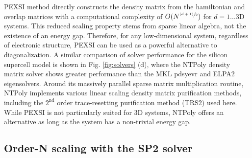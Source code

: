 \documentclass{revtex4-1}
\begin{document}
PEXSI\cite{pexsi_lin_2013} method directly constructs the density matrix from
the hamiltonian and overlap matrices with a computational complexity of
$O(N^{\sfrac{(d+1)}{2}})$ for $d=1\ldots3$D systems. This reduced scaling
property stems from sparse linear algebra, not the existence of an energy
gap. Therefore, for any low-dimensional system, regardless of electronic
structure, PEXSI can be used as a powerful alternative to diagonalization. A
similar comparison of solver performance for the silicon supercell model is
shown in Fig. \ref{fig:solvers} (d), where the NTPoly density matrix solver
shows greater performance than the MKL pdsyevr and ELPA2 eigensolvers. Around
its massively parallel sparse matrix multiplication routine, NTPoly implements
various linear scaling density matrix purification methods, including the
$2^\text{nd}$ order trace-resetting purification method
(TRS2)\cite{ANiklasson02} used here. While PEXSI is not
particularly suited for 3D systems, NTPoly offers an alternative as long as the
system has a non-trivial energy gap.


\subsection{Order-N scaling with the SP2 solver}
\end{document}
